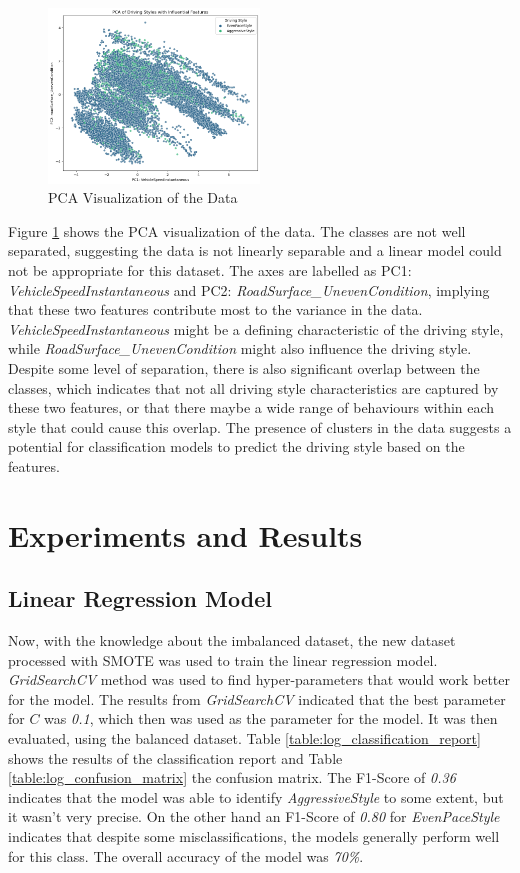 \documentclass[10pt,journal,compsoc]{IEEEtran}
\begin{document}
\begin{figure}
    \centering
    \includegraphics[width=0.5\textwidth]{images/pca_chart.png}
    \caption{PCA Visualization of the Data}
    \label{fig:pca_chart}
\end{figure}

Figure \ref{fig:pca_chart} shows the PCA visualization of the data. The classes are not well separated, suggesting the data is not
linearly separable and a linear model could not be appropriate for this dataset. 
The axes are labelled as PC1: \textit{VehicleSpeedInstantaneous} and PC2: \textit{RoadSurface\_UnevenCondition}, implying that these two features contribute most to the variance in the data.
\textit{VehicleSpeedInstantaneous} might be a defining characteristic of the driving style, while \textit{RoadSurface\_UnevenCondition} might also influence the driving style.
Despite some level of separation, there is also significant overlap between the classes, which indicates that not all driving style characteristics are captured by these two features, or that there
maybe a wide range of behaviours within each style that could cause this overlap.
The presence of clusters in the data suggests a potential for classification models to predict the driving style based on the features.


\section{Experiments and Results}
\subsection{Linear Regression Model}
Now, with the knowledge about the imbalanced dataset, the new dataset processed with SMOTE was used to train the linear regression model. \textit{GridSearchCV} method was used to 
find hyper-parameters that would work better for the model. The results from \textit{GridSearchCV} indicated that the best parameter for $C$ was \textit{0.1},
which then was used as the parameter for the model. It was then evaluated, using the balanced dataset. Table \ref{table:log_classification_report} shows the results of the classification 
report and Table \ref{table:log_confusion_matrix} the confusion matrix. The F1-Score of \textit{0.36} indicates that the model was able to identify \textit{AggressiveStyle} to some extent, but it wasn't very precise. On the other hand an F1-Score of \textit{0.80} 
for \textit{EvenPaceStyle} indicates that despite some misclassifications, the models generally perform well for this class. The overall accuracy of the model was \textit{70\%}.
\end{document}
